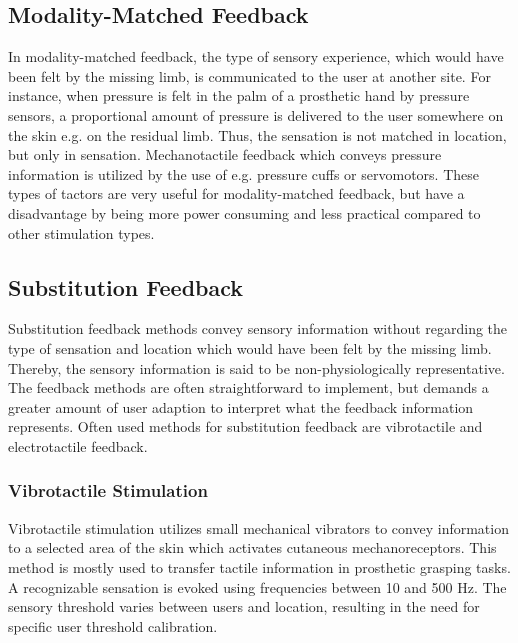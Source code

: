 \subsection{Modality-Matched Feedback}

In modality-matched feedback, the type of sensory experience, which would have been felt by the missing limb, is communicated to the user at another site. For instance, when pressure is felt in the palm of a prosthetic hand by pressure sensors, a proportional amount of pressure is delivered to the user somewhere on the skin e.g. on the residual limb. Thus, the sensation is not matched in location, but only in sensation. Mechanotactile feedback which conveys pressure information is utilized by the use of e.g. pressure cuffs or servomotors. These types of tactors are very useful for modality-matched feedback, but have a disadvantage by being more power consuming and less practical compared to other stimulation types. \cite{Schofield2014,Antfolk2018} 

\subsection{Substitution Feedback} \label{senssub}

Substitution feedback methods convey sensory information without regarding the type of sensation and location which would have been felt by the missing limb. Thereby, the sensory information is said to be non-physiologically representative. The feedback methods are often straightforward to implement, but demands a greater amount of user adaption to interpret what the feedback information represents. Often used methods for substitution feedback are vibrotactile and electrotactile feedback. \cite{Schofield2014,Antfolk2018}     

\subsubsection{Vibrotactile Stimulation}

Vibrotactile stimulation utilizes small mechanical vibrators to convey information to a selected area of the skin which activates cutaneous mechanoreceptors. This method is mostly used to transfer tactile information in prosthetic grasping tasks. \cite{Schofield2014} A recognizable sensation is evoked using frequencies between 10 and 500 Hz. The sensory threshold varies between users and location, resulting in the need for specific user threshold calibration. \cite{Antfolk2018}  


